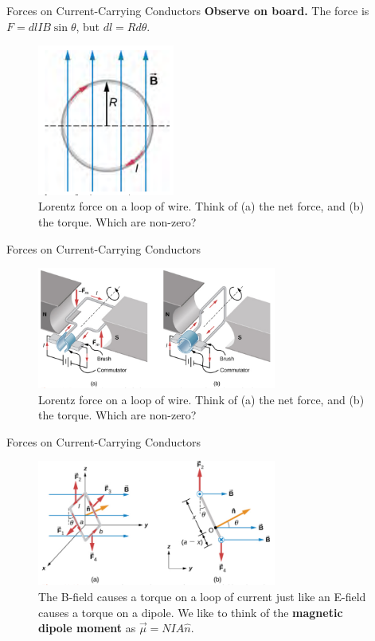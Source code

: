 \documentclass{beamer}
\begin{document}
\begin{frame}{Forces on Current-Carrying Conductors}
\textbf{Observe on board.} The force is $F = dl I B \sin\theta$, but $dl = Rd\theta$.
\begin{figure}
\centering
\includegraphics[width=0.4\textwidth,trim=0cm 0.1cm 0cm 0cm,clip=true]{figures/loop.png}
\caption{\label{fig:loop} Lorentz force on a loop of wire. Think of (a) the net force, and (b) the torque.  Which are non-zero?}
\end{figure}
\end{frame}

\begin{frame}{Forces on Current-Carrying Conductors}
\begin{figure}
\centering
\includegraphics[width=0.7\textwidth]{figures/motor11.png}
\caption{\label{fig:loop2} Lorentz force on a loop of wire. Think of (a) the net force, and (b) the torque.  Which are non-zero?}
\end{figure}
\end{frame}

\begin{frame}{Forces on Current-Carrying Conductors}
\begin{figure}
\centering
\includegraphics[width=0.7\textwidth]{figures/motor11_2.png}
\caption{\label{fig:loop3} The B-field causes a torque on a loop of current just like an E-field causes a torque on a dipole. We like to think of the \textbf{magnetic dipole moment} as $\vec{\mu} = NIA\hat{n}$.} \vspace{0.2cm}
\end{figure}
\end{frame}
\end{document}
